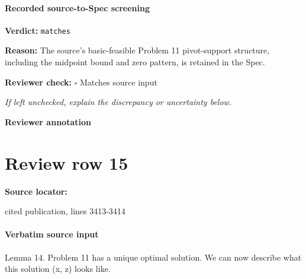 \documentclass[10pt]{article}
\newcommand{\reviewerbox}{%
  \par\noindent\fbox{\parbox{0.96\linewidth}{\rule{0pt}{0.38in}}}\par
}
\newcommand{\reviewmatch}[1]{%
  \par\noindent\textbf{Reviewer check:} $\square$\; #1\par
  \noindent\emph{If left unchecked, explain the discrepancy or uncertainty below.}\par
}
\begin{document}
\paragraph{Recorded source-to-Spec screening}
\textbf{Verdict:} \texttt{matches}
\\
{\raggedright
\textbf{Reason:} The source's basic-\allowbreak{}feasible Problem 11 pivot-\allowbreak{}support structure, including the midpoint bound and zero pattern, is retained in the Spec.\allowbreak{}
\par}
\reviewmatch{Matches source input}
\noindent\textbf{Reviewer annotation}\par
\reviewerbox
\clearpage
\hypertarget{source-claim-053b388150665c75}{}
\section*{Review row 15}
\textbf{Source locator:} {\footnotesize\raggedright cited publication, lines 3413-\allowbreak{}3414\par}
\paragraph{Verbatim source input}
\begin{ReviewVerbatim}
Lemma 14. Problem 11 has a unique optimal solution.
We can now describe what this solution (x, z) looks like.
\end{ReviewVerbatim}
\end{document}
